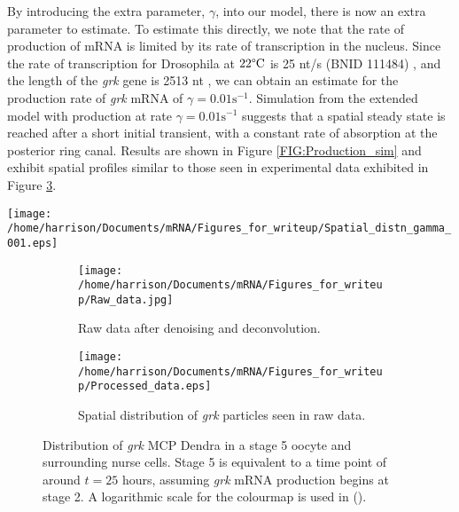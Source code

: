 \documentclass[twocolumn]{biophys}
\newlength\tindent
\renewcommand{\indent}{\hspace*{\tindent}}
\begin{document}
\indent By introducing the extra parameter, $\gamma$, into our model, there is now an extra parameter to estimate. 
To estimate this directly, we note that the rate of production of mRNA is limited by its rate of transcription in the nucleus.
Since the rate of transcription for Drosophila at $22 \degree \text{C}$ is 25 nt/s (BNID 111484) \citep{milo2010bionumbers}, and the length of the \textit{grk} gene is 2513 nt \cite{marygold2013flybase}, we can obtain an estimate for the production rate of \textit{grk} mRNA of $\gamma = 0.01 \text{s}^{-1}$.
Simulation from the extended model with production at rate $\gamma=0.01 \text{s}^{-1}$ suggests that a spatial steady state is reached after a short initial transient, with a constant rate of absorption at the posterior ring canal.
Results are shown in Figure \ref{FIG:Production_sim} and exhibit spatial profiles similar to those seen in experimental data exhibited in Figure \ref{FIG:Raw_and_processed_data}.
\begin{figure*}
 \centering
 \texttt{[image: /home/harrison/Documents/mRNA/Figures\_for\_writeup/Spatial\_distn\_gamma\_001.eps]}
 \caption{\small The spatial distribution evolving over time up to 25 hours from a single simulation of the model with production included and parameters of $\phi=0.58$, $\nu_1=1.16 \mu \text{ms}^{-1}$, $\nu_2=0.8 \mu \text{ms}^{-1}$, $\omega_1=0.42 \text{s}^{-1}$, $\omega_2=0.84 \text{s}^{-1}$, $\lambda=0.11 \text{s}^{-1}$, $\gamma = 0.01 \text{s}^{-1}$. 
 A logarithmic scale for the colourmap is used to emphasise the presence of small numbers of particles in the nurse cell.}
 \label{FIG:Production_sim}
\end{figure*}

\begin{figure} 
        \centering
        \begin{subfigure}[h]{0.76\columnwidth}
                \texttt{[image: /home/harrison/Documents/mRNA/Figures\_for\_writeup/Raw\_data.jpg]}
                \caption{Raw data after denoising and deconvolution.}
                \label{fig:aa}
        \end{subfigure}%
        
        
        \begin{subfigure}[h]{0.86\columnwidth}
                \texttt{[image: /home/harrison/Documents/mRNA/Figures\_for\_writeup/Processed\_data.eps]}
                \caption{Spatial distribution of \textit{grk} particles seen in raw data.}
                \label{fig:bb}
        \end{subfigure}
        
        \caption{\small Distribution of \textit{grk} MCP Dendra in a stage 5  oocyte and surrounding nurse cells. Stage 5 is equivalent to a time point of around $t=25$ hours, assuming \textit{grk} mRNA production begins at stage 2. A logarithmic scale for the colourmap is used in ().}
        \label{FIG:Raw_and_processed_data}
\end{figure}
\end{document}
